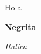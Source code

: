 \documentclass[12pt,a4paper,violet,openany]{bbe}
\begin{document}
Hola\par\textbf{Negrita}\par\textit{Italica}
\end{document}
